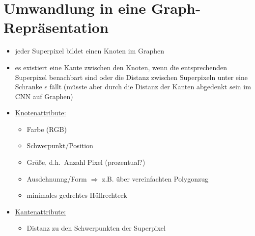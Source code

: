 \section{Umwandlung in eine Graph-Repräsentation}

\begin{itemize}
  \item jeder Superpixel bildet einen Knoten im Graphen
  \item es existiert eine Kante zwischen den Knoten, wenn die entsprechenden Superpixel benachbart sind oder die Distanz zwischen Superpixeln unter eine Schranke $\epsilon$ fällt (müsste aber durch die Distanz der Kanten abgedenkt sein im CNN auf Graphen)
  \item \underline{Knotenattribute:}
  \begin{itemize}
    \item Farbe (RGB)
    \item Schwerpunkt/Position
    \item Größe, d.h.\ Anzahl Pixel (prozentual?)
    \item Ausdehnunng/Form $\Rightarrow$ z.B. über vereinfachten Polygonzug
    \item minimales gedrehtes Hüllrechteck
  \end{itemize}
  \item \underline{Kantenattribute:}
  \begin{itemize}
    \item Distanz zu den Schwerpunkten der Superpixel
  \end{itemize}
\end{itemize}
